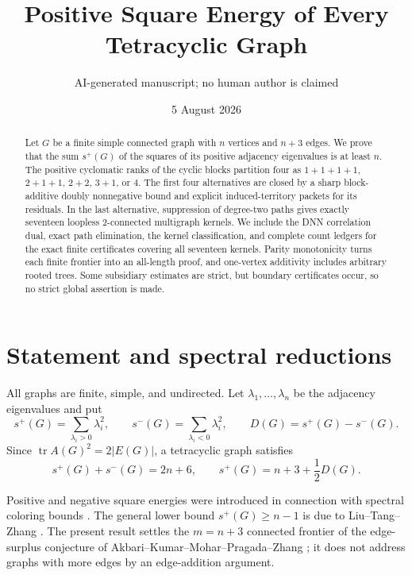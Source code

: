 \documentclass[11pt]{article}
\title{Positive Square Energy of Every Tetracyclic Graph}
\author{AI-generated manuscript; no human author is claimed}
\date{5 August 2026}
\theoremstyle{remark}
\newcommand{\splus}{s^+}
\newcommand{\sminus}{s^-}
\begin{document}
\maketitle

\begin{abstract}
Let $G$ be a finite simple connected graph with $n$ vertices and $n+3$
edges.  We prove that the sum $\splus(G)$ of the squares of its positive
adjacency eigenvalues is at least $n$.  The positive cyclomatic ranks of the
cyclic blocks partition four as $1+1+1+1$, $2+1+1$, $2+2$, $3+1$, or $4$.
The first four alternatives are closed by a sharp block-additive doubly
nonnegative bound and explicit induced-territory packets for its residuals.
In the last alternative, suppression of degree-two paths gives exactly
seventeen loopless $2$-connected multigraph kernels.  We include the DNN
correlation dual, exact path elimination, the kernel classification, and
complete count ledgers for the exact finite certificates covering all
seventeen kernels.  Parity monotonicity turns each finite frontier into an
all-length proof, and one-vertex additivity includes arbitrary rooted trees.
Some subsidiary estimates are strict, but boundary certificates occur, so no
strict global assertion is made.
\end{abstract}

\section{Statement and spectral reductions}

All graphs are finite, simple, and undirected.  Let
$\lambda_1,\ldots,\lambda_n$ be the adjacency eigenvalues and put
\[
 \splus(G)=\sum_{\lambda_i>0}\lambda_i^2,
 \qquad \sminus(G)=\sum_{\lambda_i<0}\lambda_i^2,
 \qquad D(G)=\splus(G)-\sminus(G).
\]
Since $\operatorname{tr}A(G)^2=2|E(G)|$, a tetracyclic graph satisfies
\begin{equation}\label{eq:trace}
 \splus(G)+\sminus(G)=2n+6,
 \qquad \splus(G)=n+3+\frac12D(G).
\end{equation}

Positive and negative square energies were introduced in connection with
spectral coloring bounds \cite{AbiadEtAl}.  The general lower bound
$\splus(G)\geq n-1$ is due to Liu--Tang--Zhang \cite{LTZ}.  The present result
settles the $m=n+3$ connected frontier of the edge-surplus conjecture of
Akbari--Kumar--Mohar--Pragada--Zhang \cite{AKMPZ}; it does not address graphs
with more edges by an edge-addition argument.
\end{document}
